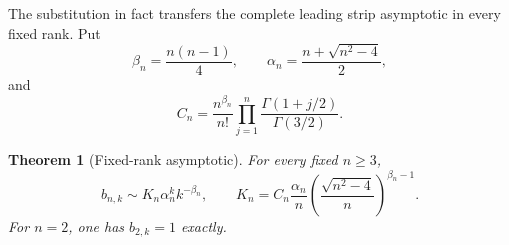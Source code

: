 \documentclass[11pt]{article}
\newtheorem{theorem}{Theorem}[section]
\theoremstyle{definition}
\begin{document}
The substitution in fact transfers the complete leading strip asymptotic in
every fixed rank.  Put
\[
 \beta_n=\frac{n(n-1)}4,
 \qquad
 \alpha_n=\frac{n+\sqrt{n^2-4}}2,
\]
and
\begin{equation}\label{eq:regev-constant}
 C_n=\frac{n^{\beta_n}}{n!}
 \prod_{j=1}^n\frac{\Gamma(1+j/2)}{\Gamma(3/2)}.
\end{equation}

\begin{theorem}[Fixed-rank asymptotic]\label{thm:fixed-rank-asymptotic}
For every fixed $n\ge3$,
\begin{equation}\label{eq:fixed-rank-asymptotic}
 b_{n,k}\sim K_n\alpha_n^k k^{-\beta_n},
 \qquad
 K_n=C_n\frac{\alpha_n}{n}
 \left(\frac{\sqrt{n^2-4}}{n}\right)^{\beta_n-1}.
\end{equation}
For $n=2$, one has $b_{2,k}=1$ exactly.
\end{theorem}
\end{document}
